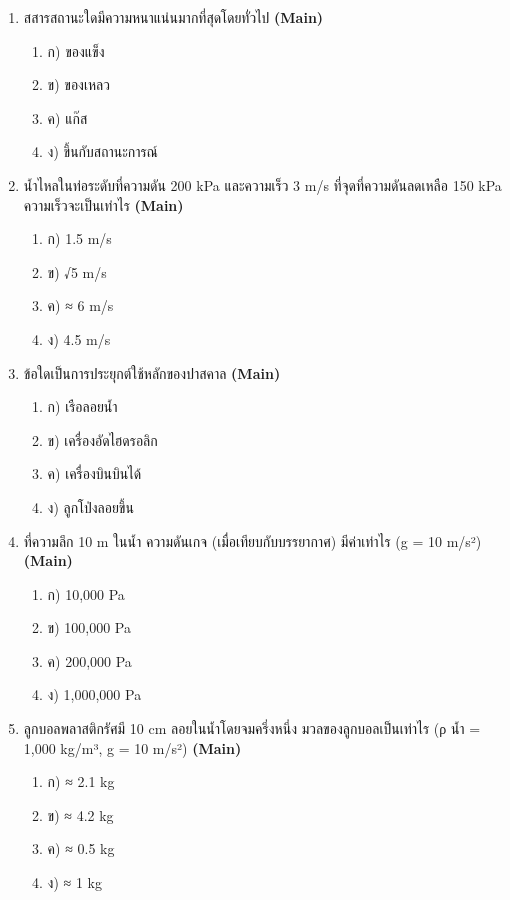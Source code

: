 \documentclass[12pt]{article}
\begin{document}
\begin{enumerate}[label=\arabic*.]
\begin{enumerate}[label=)]
\item ง) 16 m/s
\end{enumerate}
\item สสารสถานะใดมีความหนาแน่นมากที่สุดโดยทั่วไป \hfill \textbf{\small (Main)}
\begin{enumerate}[label=)]
\item ก) ของแข็ง
\item ข) ของเหลว
\item ค) แก๊ส
\item ง) ขึ้นกับสถานะการณ์
\end{enumerate}
\item น้ำไหลในท่อระดับที่ความดัน 200 kPa และความเร็ว 3 m/s ที่จุดที่ความดันลดเหลือ 150 kPa ความเร็วจะเป็นเท่าไร \hfill \textbf{\small (Main)}
\begin{enumerate}[label=)]
\item ก) 1.5 m/s
\item ข) √5 m/s
\item ค) ≈ 6 m/s
\item ง) 4.5 m/s
\end{enumerate}
\item ข้อใดเป็นการประยุกต์ใช้หลักของปาสคาล \hfill \textbf{\small (Main)}
\begin{enumerate}[label=)]
\item ก) เรือลอยน้ำ
\item ข) เครื่องอัดไฮดรอลิก
\item ค) เครื่องบินบินได้
\item ง) ลูกโป่งลอยขึ้น
\end{enumerate}
\item ที่ความลึก 10 m ในน้ำ ความดันเกจ (เมื่อเทียบกับบรรยากาศ) มีค่าเท่าไร (g = 10 m/s²) \hfill \textbf{\small (Main)}
\begin{enumerate}[label=)]
\item ก) 10,000 Pa
\item ข) 100,000 Pa
\item ค) 200,000 Pa
\item ง) 1,000,000 Pa
\end{enumerate}
\item ลูกบอลพลาสติกรัศมี 10 cm ลอยในน้ำโดยจมครึ่งหนึ่ง มวลของลูกบอลเป็นเท่าไร (ρ น้ำ = 1,000 kg/m³, g = 10 m/s²) \hfill \textbf{\small (Main)}
\begin{enumerate}[label=)]
\item ก) ≈ 2.1 kg
\item ข) ≈ 4.2 kg
\item ค) ≈ 0.5 kg
\item ง) ≈ 1 kg

\end{enumerate}
\end{enumerate}
\end{document}
